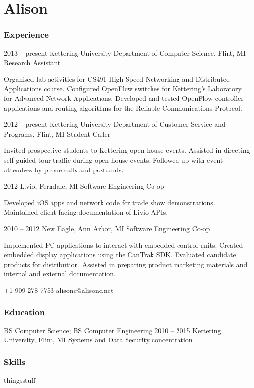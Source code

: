 \documentclass[12pt]{tccv/actccv}
\begin{document}
\part{Alison}

\section{Experience}

\begin{eventlist}
\item{2013 -- present}
     {Kettering University Department of Computer Science, Flint, MI}
     {Research Assistant}
     
     Organised lab activities for CS491 High-Speed Networking and 
     Distributed Applications course. Configured OpenFlow switches 
     for Kettering's Laboratory for Advanced Network Applications.
     Developed and tested OpenFlow controller applications and routing algorithms 
     for the Reliable Communications Protocol.

\item{2012 -- present}
     {Kettering University Department of Customer Service and Programs, Flint, MI}
     {Student Caller}
     
     Invited prospective students to Kettering open house events.
     Assisted in directing self-guided tour traffic during open house events.
     Followed up with event attendees by phone calls and postcards.
     
\item{2012}
     {Livio, Ferndale, MI}
     {Software Engineering Co-op}
     
     Developed iOS apps and network code for trade show demonstrations.
     Maintained client-facing documentation of Livio APIs.
     
\item{2010 -- 2012}
     {New Eagle, Ann Arbor, MI}
     {Software Engineering Co-op}
     
     Implemented PC applications to interact with embedded control units.
     Created embedded display applications using the CanTrak SDK.
     Evaluated candidate products for distribution.
     Assisted in preparing product marketing materials and internal and 
     external documentation.
     
\end{eventlist}

    {+1 909 278 7753}
    {alisonc@alisonc.net}

\section{Education}

\begin{yearlist}

\item[BS Computer Science; BS Computer Engineering]{2010 -- 2015}
     {Kettering University, Flint, MI}
     {Systems and Data Security concentration}

\end{yearlist}

\section{Skills}

\begin{factlist}
\item{things}{stuff}
\end{factlist}
\end{document}
